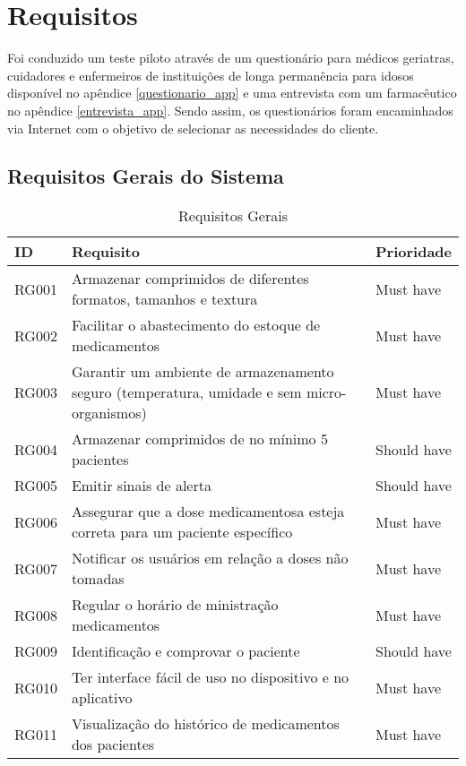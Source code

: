 \chapter[Requisitos]{Requisitos}

Foi conduzido um teste piloto através de um questionário para médicos geriatras, cuidadores e enfermeiros de instituições de longa permanência para idosos disponível no apêndice \ref{questionario_app} e uma entrevista com um farmacêutico no apêndice \ref{entrevista_app}. Sendo assim, os questionários foram encaminhados via Internet com o objetivo de selecionar as necessidades do cliente. 

\section{Requisitos Gerais do Sistema}

\begin{table}[H]
    \centering
    \caption{Requisitos Gerais}
    \begin{tabular}{|L{2cm}|L{8cm}|C{2.5cm}|}
        \hline
        \textbf{ID} & \textbf{Requisito} & \textbf{Prioridade} \\
        \hline
        RG001 & Armazenar comprimidos de diferentes formatos, tamanhos e textura & Must have\\ 
        \hline
        RG002 & Facilitar o abastecimento do estoque de medicamentos & Must have \\
        \hline
        RG003 & Garantir um ambiente de armazenamento seguro (temperatura, umidade e sem micro-organismos) & Must have\\ 
        \hline
        RG004 & Armazenar comprimidos de no mínimo 5 pacientes  & Should have\\ 
        \hline
        RG005 & Emitir sinais de alerta & Should have\\ 
        \hline
        RG006 & Assegurar que a dose medicamentosa esteja correta para um paciente específico & Must have\\
        \hline
        RG007 & Notificar os usuários em relação a doses não tomadas & Must have\\
        \hline
        RG008 & Regular o horário de ministração medicamentos & Must have\\ 
        \hline
        RG009 &  Identificação e comprovar o paciente  & Should have\\
        \hline
        RG010 & Ter interface fácil de uso no dispositivo e no aplicativo & Must have\\
        \hline
        RG011 & Visualização do histórico de medicamentos dos pacientes & Must have\\ 
        \hline
    \end{tabular}
\end{table}


